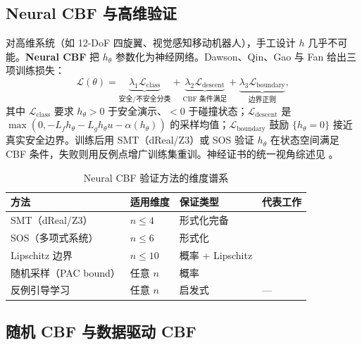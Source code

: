 \subsection{Neural CBF 与高维验证}

对高维系统（如 12-DoF 四旋翼、视觉感知移动机器人），手工设计 $h$ 几乎不可能。\textbf{Neural CBF} 把 $h_\theta$ 参数化为神经网络。Dawson、Qin、Gao 与 Fan \cite{dawson2021safe} 给出三项训练损失：
\begin{equation}
\mathcal L(\theta)=\underbrace{\lambda_1\mathcal L_{\mathrm{class}}}_{\text{安全/不安全分类}}+\underbrace{\lambda_2\mathcal L_{\mathrm{descent}}}_{\text{CBF 条件满足}}+\underbrace{\lambda_3\mathcal L_{\mathrm{boundary}}}_{\text{边界正则}},
\label{eq:neural-cbf-loss}
\end{equation}
其中 $\mathcal L_{\mathrm{class}}$ 要求 $h_\theta>0$ 于安全演示、$<0$ 于碰撞状态；$\mathcal L_{\mathrm{descent}}$ 是 $\max(0,-L_fh_\theta-L_gh_\theta u-\alpha(h_\theta))$ 的采样均值；$\mathcal L_{\mathrm{boundary}}$ 鼓励 $\{h_\theta=0\}$ 接近真实安全边界。训练后用 SMT（dReal/Z3）或 SOS 验证 $h_\theta$ 在状态空间满足 CBF 条件，失败则用反例点增广训练集重训。神经证书的统一视角综述见 \cite{dawson2023survey}。

\begin{table}[H]\centering\small
\caption{Neural CBF 验证方法的维度谱系}
\label{tab:neural-cbf-verify}
\begin{tabular}{llll}
\toprule
方法 & 适用维度 & 保证类型 & 代表工作 \\
\midrule
SMT（dReal/Z3） & $n\le4$ & 形式化完备 & \cite{dawson2021safe} \\
SOS（多项式系统） & $n\le6$ & 形式化 & \cite{prajna2007barrier} \\
Lipschitz 边界 & $n\le10$ & 概率 + Lipschitz & \cite{fazlyab2019lipschitz} \\
随机采样（PAC bound） & 任意 $n$ & 概率 & \cite{robey2020learning} \\
反例引导学习 & 任意 $n$ & 启发式 & --- \\
\bottomrule
\end{tabular}
\end{table}

\subsection{随机 CBF 与数据驱动 CBF}

